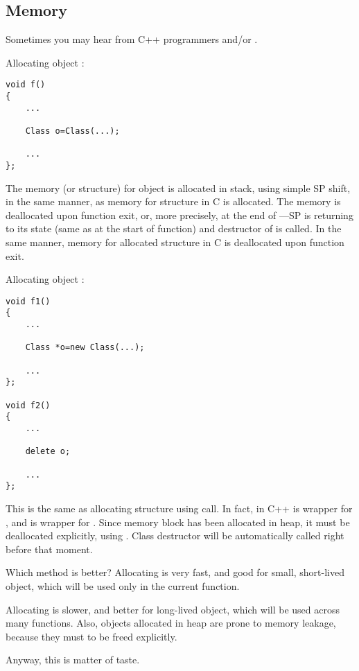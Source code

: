 \subsection{Memory}

Sometimes you may hear from C++ programmers  and/or .

Allocating object :

\begin{lstlisting}
void f()
{
	...

	Class o=Class(...);

	...
};
\end{lstlisting}

The memory (or structure) for object is allocated in stack, using simple \ac{SP} shift, in the same manner, as memory for structure in C is allocated.
The memory is deallocated upon function exit, or, more precisely, at the end of ---\ac{SP} is returning to its state (same as at the start of function) and destructor of  is called.
In the same manner, memory for allocated structure in C is deallocated upon function exit.

Allocating object :

\begin{lstlisting}
void f1()
{
	...

	Class *o=new Class(...);

	...
};

void f2()
{
	...

	delete o;

	...
};
\end{lstlisting}

This is the same as allocating structure using  call.
In fact,  in C++ is wrapper for , and  is wrapper for .
Since memory block has been allocated in \gls{heap}, it must be deallocated explicitly, using .
Class destructor will be automatically called right before that moment.

Which method is better?
Allocating  is very fast, and good for small, short-lived object, which will be used only in the current function.

Allocating  is slower, and better for long-lived object, which will be used across many functions.
Also, objects allocated in \gls{heap} are prone to memory leakage, because they must to be freed explicitly.

Anyway, this is matter of taste.
